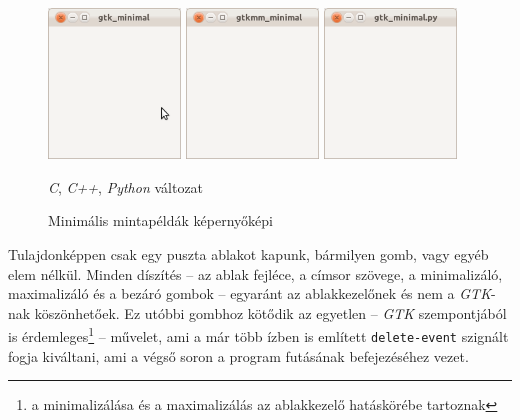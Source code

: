 \begin{figure}[ht]
\begin{center}
\includegraphics[height=40mm]{images/screenshot_gtk_minimal.png}\hspace{0.05\textwidth}
\includegraphics[height=40mm]{images/screenshot_gtkmm_minimal.png}\hspace{0.05\textwidth}
\includegraphics[height=40mm]{images/screenshot_gtkpy_minimal.png}
\caption{Minimális mintapéldák képernyőképi}{\textit{C}, \textit{C++}, \textit{Python} változat}
\label{fig:screenshotminimap}
\end{center}
\end{figure}

Tulajdonképpen csak egy puszta ablakot kapunk, bármilyen gomb, vagy egyéb elem nélkül. Minden díszítés -- az ablak fejléce, a címsor szövege, a minimalizáló, maximalizáló és a bezáró gombok -- egyaránt az ablakkezelőnek és nem a \textit{GTK}-nak köszönhetőek. Ez utóbbi gombhoz kötődik az egyetlen -- \textit{GTK} szempontjából is érdemleges\footnote{a minimalizálása és a maximalizálás az ablakkezelő hatáskörébe tartoznak} -- művelet, ami a már több ízben is említett \texttt{delete-event} szignált fogja kiváltani, ami a végső soron a program futásának befejezéséhez vezet.

